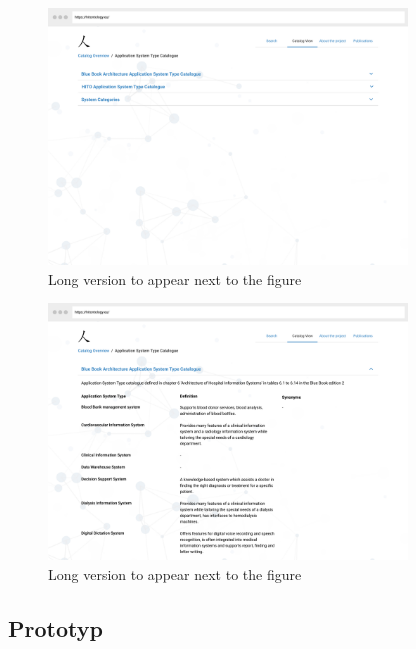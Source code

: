 \begin{figure}
	\centering
    	\includegraphics[width=0.85\textwidth]{Images/Mockup_Katalog_Detailseite}
   	\caption[Mockup -- Detailseite Katalog]{Long version to appear next to the figure}
   	\label{fig:mockup_catalogue_detail}
\end{figure}

\clearpage

\begin{figure}
	\centering
    	\includegraphics[width=0.85\textwidth]{Images/Mockup_Katalog_Detailseite_Ausgeklappt}
   	\caption[Mockup -- Detailseite Katalog ausgeklappt]{Long version to appear next to the figure}
   	\label{fig:mockup_catalogue_detail_expanded}
\end{figure}

\clearpage

\subsection{Prototyp}

